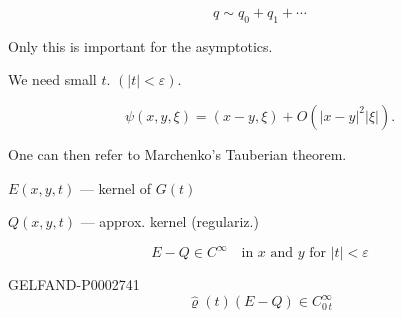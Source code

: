 
\begin{equation*}q\sim q_0+q_1+\cdots\end{equation*}

Only this is important for the asymptotics.

We need small $t$. $(|t|<\varepsilon)$.

\begin{equation*}\psi (x, y,\xi)=(x-y,\xi)+O (|x-y|^2|\xi|).\end{equation*}

One can then refer to Marchenko’s Tauberian theorem.

$E (x, y, t)$ --- kernel of $G (t)$

$Q (x, y, t)$ --- approx. kernel (regulariz.)

\begin{equation*}E-Q\in C^\infty\quad\text{in $x$ and $y$ for $|t|<\varepsilon$}\end{equation*}

\begin{GelfandAdjacentEvidence}{GELFAND-P000274}{1}
\begin{equation*}\hat\varrho (t)(E-Q)\in C^\infty_{0\, t}\end{equation*}

\end{GelfandAdjacentEvidence}


